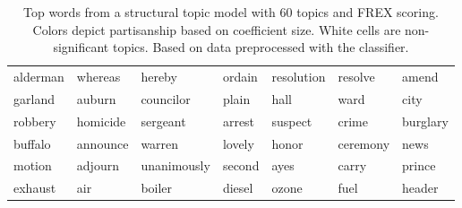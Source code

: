 \begin{table}[ht]
\begin{tabular}{lllllll}
  \cellcolor{red!10}alderman & \cellcolor{red!10}whereas & \cellcolor{red!10}hereby & \cellcolor{red!10}ordain & \cellcolor{red!10}resolution & \cellcolor{red!10}resolve & \cellcolor{red!10}amend \\ 
  \cellcolor{red!10}garland & \cellcolor{red!10}auburn & \cellcolor{red!10}councilor & \cellcolor{red!10}plain & \cellcolor{red!10}hall & \cellcolor{red!10}ward & \cellcolor{red!10}city \\ 
  \cellcolor{blue!80}robbery & \cellcolor{blue!80}homicide & \cellcolor{blue!80}sergeant & \cellcolor{blue!80}arrest & \cellcolor{blue!80}suspect & \cellcolor{blue!80}crime & \cellcolor{blue!80}burglary \\ 
  \cellcolor{red!10}buffalo & \cellcolor{red!10}announce & \cellcolor{red!10}warren & \cellcolor{red!10}lovely & \cellcolor{red!10}honor & \cellcolor{red!10}ceremony & \cellcolor{red!10}news \\ 
  \cellcolor{red!10}motion & \cellcolor{red!10}adjourn & \cellcolor{red!10}unanimously & \cellcolor{red!10}second & \cellcolor{red!10}ayes & \cellcolor{red!10}carry & \cellcolor{red!10}prince \\ 
  \cellcolor{white}exhaust & \cellcolor{white}air & \cellcolor{white}boiler & \cellcolor{white}diesel & \cellcolor{white}ozone & \cellcolor{white}fuel & \cellcolor{white}header \\ 
   \hline
\end{tabular}
\endgroup
\caption{Top words from a structural topic model with 60 topics and FREX scoring. Colors depict partisanship based on coefficient size. White cells are non-significant topics. Based on data preprocessed with the classifier.} 
\end{table}

